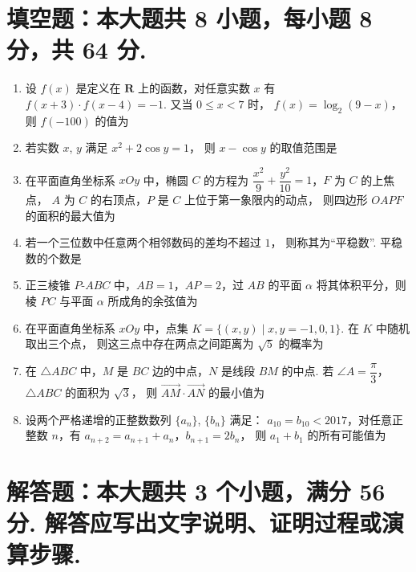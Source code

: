 \documentclass{chsmc}
\begin{document}
\section{填空题：本大题共 8 小题，每小题 8 分，共 64 分.}

\begin{enumerate}
  \item 设 $f(x)$ 是定义在 $\mathbf{R}$ 上的函数，对任意实数 $x$ 有
    $f(x+3)\cdot f(x-4) = -1$. 又当 $0 \leqslant x < 7$ 时，
    $f(x) = \log_2(9-x)$，则 $f(-100)$ 的值为 \blankline
  \item 若实数 $x$, $y$ 满足 $x^2 + 2\cos y = 1$，
    则 $x - \cos y$ 的取值范围是 \blankline
  \item 在平面直角坐标系 $xOy$ 中，椭圆 $C$ 的方程为
    $\dfrac{x^2}{9} + \dfrac{y^2}{10} = 1$，$F$ 为 $C$ 的上焦点，
    $A$ 为 $C$ 的右顶点，$P$ 是 $C$ 上位于第一象限内的动点，
    则四边形 $OAPF$ 的面积的最大值为 \blankline
  \item 若一个三位数中任意两个相邻数码的差均不超过 $1$，
    则称其为“平稳数”. 平稳数的个数是 \blankline
  \item 正三棱锥 $P$-$ABC$ 中，$AB = 1$，$AP = 2$，过 $AB$ 的平面 $\alpha$
    将其体积平分，则棱 $PC$ 与平面 $\alpha$ 所成角的余弦值为 \blankline
  \item 在平面直角坐标系 $xOy$ 中，点集
    $K = \{(x,y) \mid x, y = -1, 0, 1\}$. 在 $K$ 中随机取出三个点，
    则这三点中存在两点之间距离为 $\sqrt{5}$ 的概率为 \blankline
  \item 在 $\triangle ABC$ 中，$M$ 是 $BC$ 边的中点，$N$ 是线段 $BM$ 的中点.
    若 $\angle A = \dfrac{\pi}{3}$，$\triangle ABC$ 的面积为 $\sqrt{3}$，
    则 $\overrightarrow{AM}\cdot\overrightarrow{AN}$ 的最小值为 \blankline
  \item 设两个严格递增的正整数数列 $\{a_n\}$, $\{b_n\}$ 满足：
    $a_{10} = b_{10} < 2017$，对任意正整数 $n$，有
    $a_{n+2} = a_{n+1} + a_n$，$b_{n+1} = 2b_n$，
    则 $a_1 + b_1$ 的所有可能值为 \blankline
\end{enumerate}

\section{解答题：本大题共 3 个小题，满分 56 分. 解答应写出文字说明、证明过程或演算步骤.}
\end{document}
